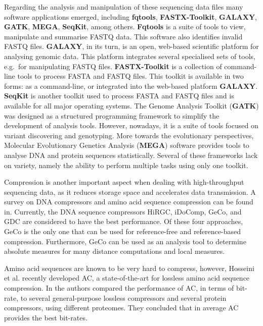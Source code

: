 \documentclass[11pt,]{krantz}
\begin{document}
Regarding the analysis and manipulation of these sequencing data files many software applications emerged, including \textbf{fqtools}\citep{droop2016fqtools}, \textbf{FASTX-Toolkit}\citep{gordon2010fastx}, \textbf{GALAXY}\citep{afgan2018galaxy}, \textbf{GATK}\citep{depristo2011framework}, \textbf{MEGA}\citep{kumar2016mega7}, \textbf{SeqKit}\citep{shen2016seqkit}, among others. \textbf{Fqtools} is a suite of tools to view, manipulate and summarise FASTQ data. This software also identifies invalid FASTQ files\citep{droop2016fqtools}. \textbf{GALAXY}, in its turn, is an open, web-based scientific platform for analysing genomic data\citep{goecks2010galaxy}. This platform integrates several specialised sets of tools, e.g.~for manipulating FASTQ files\citep{blankenberg2010manipulation}. \textbf{FASTX-Toolkit} is a collection of command-line tools to process FASTA and FASTQ files. This toolkit is available in two forms: as a command-line, or integrated into the web-based platform \textbf{GALAXY}\citep{gordon2010fastx}. \textbf{SeqKit} is another toolkit used to process FASTA and FASTQ files and is available for all major operating systems\citep{shen2016seqkit}. The Genome Analysis Toolkit (\textbf{GATK}) was designed as a structured programming framework to simplify the development of analysis tools. However, nowadays, it is a suite of tools focused on variant discovering and genotyping\citep{van2013fastq}. More towards the evolutionary perspectives, Molecular Evolutionary Genetics Analysis (\textbf{MEGA}) software provides tools to analyse DNA and protein sequences statistically\citep{tamura2011mega5}. Several of these frameworks lack on variety, namely the ability to perform multiple tasks using only one toolkit.

Compression is another important aspect when dealing with high-throughput sequencing data, as it reduces storage space and accelerates data transmission. A survey on DNA compressors and amino acid sequence compression can be found in\citep{hosseini2016survey}. Currently, the DNA sequence compressors HiRGC\citep{liu2017high}, iDoComp\citep{ochoa2014idocomp}, GeCo\citep{pratas2016efficient}, and GDC\citep{deorowicz2015gdc} are considered to have the best performance\citep{hernaez2019genomic}. Of these four approaches, GeCo is the only one that can be used for reference-free and reference-based compression. Furthermore, GeCo can be used as an analysis tool to determine absolute measures for many distance computations and local measures\citep{pratas2016efficient}.

Amino acid sequences are known to be very hard to compress\citep{nalbantoglu2010data}, however, Hosseini et al.\citep{hosseini2019ac} recently developed AC, a state-of-the-art for lossless amino acid sequence compression. In\citep{pratas2018compression} the authors compared the performance of AC, in terms of bit-rate, to several general-purpose lossless compressors and several protein compressors, using different proteomes. They concluded that in average AC provides the best bit-rates.
\end{document}
